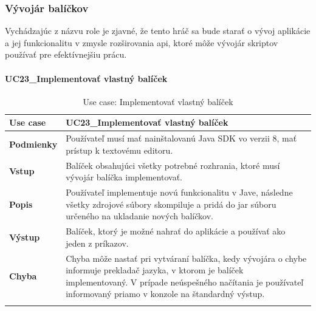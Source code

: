 \subsubsection{Vývojár balíčkov}
\indent Vychádzajúc z názvu role je zjavné, že tento hráč sa bude starať o vývoj aplikácie a jej funkcionalitu v zmysle rozširovania \acrshort{api}, ktoré môže vývojár skriptov používať pre efektívnejšiu prácu.
\paragraph{UC23\_Implementovať vlastný balíček}
\begin{center}
	\begin{longtable}{|p{2.5cm}|p{12.2cm}|}
		
			\hline
			\textbf{Use case} & UC23\_Implementovať vlastný balíček \\ 
			\hline
			\textbf{Podmienky} & Používateľ musí mať nainštalovanú Java SDK vo verzii 8, mať prístup k textovému editoru.  \\ 
			\hline
			\textbf{Vstup} & Balíček obsahujúci všetky potrebné rozhrania, ktoré musí vývojár balíčka implementovať.\\
			\hline
			\textbf{Popis} & Používateľ implementuje novú funkcionalitu v Jave, následne všetky zdrojové súbory skompiluje a pridá do \acrshort{jar} súboru určeného na ukladanie nových balíčkov.\\ 
			\hline
			\textbf{Výstup} & Balíček, ktorý je možné nahrať do aplikácie a používať ako jeden z príkazov.\\
			\hline
			\textbf{Chyba} & Chyba môže nastať pri vytváraní balíčka, kedy vývojára o chybe informuje prekladač jazyka, v ktorom je balíček implementovaný. V prípade neúspešného načítania je používateľ informovaný priamo v konzole na štandardný výstup.\\
			\hline
		\caption{Use case: Implementovať vlastný balíček}
		\label{table:1}
		
	\end{longtable}
\end{center}

